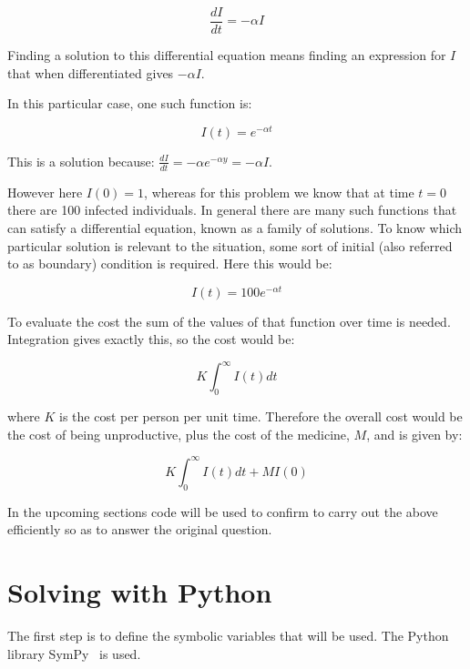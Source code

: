 \begin{equation}
    \frac{dI}{dt} = -\alpha I
\end{equation}

Finding a solution to this differential equation means finding an expression for
\(I\) that when differentiated gives \(- \alpha I\).

In this particular case, one such function is:

\begin{equation}
    I(t) = e ^ {-\alpha t}
\end{equation}

This is a solution because:
\(\frac{dI}{dt} = -\alpha e ^ {-\alpha y} = -\alpha I\).

However here \(I(0) = 1\), whereas for this problem we know that at time \(t=0\)
there are 100 infected individuals. In general there are many such functions
that can satisfy a differential equation, known as a family of solutions. To
know which particular solution is relevant to the situation, some sort of
initial (also referred to as boundary) condition is required. Here this would
be:

\begin{equation}
    I(t) = 100e ^ {-\alpha t}
\end{equation}

To evaluate the cost the sum of the values of that function over time is needed.
Integration gives exactly this, so the cost would be:

\begin{equation}
    K \int_{0}^{\infty}I(t)dt
\end{equation}

where \(K\) is the cost per person per unit time.
Therefore the overall cost would be the cost of being unproductive, plus the cost
of the medicine, \(M\), and is given by:

\begin{equation}
K \int_{0}^{\infty}I(t)dt + M I(0)
\end{equation}

In the upcoming sections code will be used to confirm to carry out the above
efficiently so as to answer the original question.

\section{Solving with Python}\label{sec:differential_equations_solving-with-python}

The first step is to define the symbolic variables that will be used.  The
Python library SymPy~\cite{meurer2017sympy} is used.

